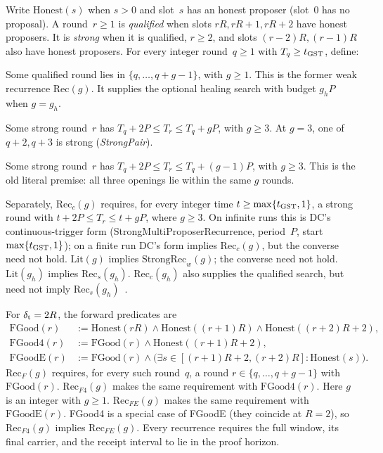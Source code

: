 \documentclass{article}
\theoremstyle{plain}
\theoremstyle{definition}
\theoremstyle{remark}
\begin{document}
Write $\mathrm{Honest}(s)$ when $s>0$ and slot~$s$ has an honest proposer (slot~$0$ has no proposal).
A round~$r\geq1$ is \emph{qualified} when slots $rR,rR+1,rR+2$ have
honest proposers.  It is \emph{strong} when it is qualified, $r\geq2$,
and slots $(r-2)R,(r-1)R$ also have honest proposers.
For every integer round~$q\geq1$ with $T_q\geq t_{\rm GST}$, define:
\begin{description}[leftmargin=1.5em]
\item[$\mathrm{Rec}_{s}(g)$.]  Some qualified round lies in
  $\{q,\ldots,q+g-1\}$, with $g\geq1$.  This is the former weak
  recurrence $\mathrm{Rec}(g)$.  It supplies the optional healing
  search with budget $g_hP$ when $g=g_h$.
\item[$\mathrm{StrongRec}_{w}(g)$.]  Some strong round~$r$ has
  $T_q+2P\leq T_r\leq T_q+gP$, with $g\geq3$.
  At $g=3$, one of $q+2,q+3$ is strong (\emph{StrongPair}).
\item[$\mathrm{Lit}(g)$.]  Some strong round~$r$ has
  $T_q+2P\leq T_r\leq T_q+(g-1)P$, with $g\geq3$.
  This is the old literal premise: all three openings lie within the
  same $g$ rounds.
\end{description}
Separately, $\mathrm{Rec}_{c}(g)$ requires, for every integer time
$t\geq\max\{t_{\rm GST},1\}$, a strong round with $t+2P\leq T_r\leq t+gP$,
where $g\geq3$.  On infinite runs this is DC's continuous-trigger form
(\textsf{StrongMultiProposerRecurrence}, period~$P$, start
$\max\{t_{\rm GST},1\}$); on a finite run DC's form implies
$\mathrm{Rec}_{c}(g)$, but the converse need not hold.
$\mathrm{Lit}(g)$ implies $\mathrm{StrongRec}_{w}(g)$; the converse
need not hold.  $\mathrm{Lit}(g_h)$ implies $\mathrm{Rec}_{s}(g_h)$.
$\mathrm{Rec}_{c}(g_h)$ also supplies the qualified search, but need
not imply $\mathrm{Rec}_{s}(g_h)$~\cite[\S2.5]{BPO}.

For $\delta_{\rm t}=2R$, the forward predicates are
\begin{align*}
 \mathrm{FGood}(r)&:=\mathrm{Honest}(rR)\land\mathrm{Honest}((r+1)R)
                    \land\mathrm{Honest}((r+2)R+2),\\
 \mathrm{FGood4}(r)&:=\mathrm{FGood}(r)\land\mathrm{Honest}((r+1)R+2),\\
 \mathrm{FGoodE}(r)&:=\mathrm{FGood}(r)\land
   \bigl(\exists s\in[(r+1)R+2,(r+2)R]:\mathrm{Honest}(s)\bigr).
\end{align*}
$\mathrm{Rec}_{F}(g)$ requires, for every such round~$q$, a round
$r\in\{q,\ldots,q+g-1\}$ with $\mathrm{FGood}(r)$.
$\mathrm{Rec}_{F4}(g)$ makes the same requirement with
$\mathrm{FGood4}(r)$.  Here $g$ is an integer with $g\geq1$.
$\mathrm{Rec}_{FE}(g)$ makes the same requirement with $\mathrm{FGoodE}(r)$.
FGood4 is a special case of FGoodE (they coincide at $R=2$), so
$\mathrm{Rec}_{F4}(g)$ implies $\mathrm{Rec}_{FE}(g)$.
Every recurrence requires the
full window, its final carrier, and the receipt interval to lie in the proof horizon.
\end{document}
